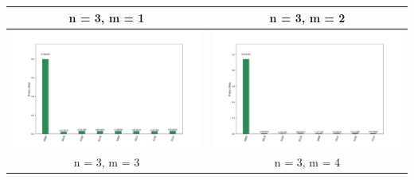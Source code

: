 \newpage
\begin{landscape}
\begin{table}[ht]
    \begin{tabular}{c c} 
        \hline
        n = 3, m = 1 & n = 3, m = 2 \\ \hline
        \includegraphics[scale=0.32]{Grover_results/Grover_n=3,m=1.png} & \includegraphics[scale=0.32]{Grover_results/Grover_n=3,m=2.png} \\ \hline
        n = 3, m = 3 & n = 3, m = 4 \\ \hline

\end{tabular}
\end{table}
\end{landscape}
